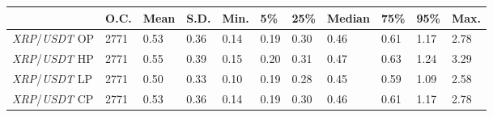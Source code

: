 \begin{tabular}{lllllllllll}
\toprule
 & \textbf{O.C.} & \textbf{Mean} & \textbf{S.D.} & \textbf{Min.} & \textbf{5\%} & \textbf{25\%} & \textbf{Median} & \textbf{75\%} & \textbf{95\%} & \textbf{Max.} \\
\midrule
\emph{XRP}/\emph{USDT} OP & 2771 & 0.53 & 0.36 & 0.14 & 0.19 & 0.30 & 0.46 & 0.61 & 1.17 & 2.78 \\
\emph{XRP}/\emph{USDT} HP & 2771 & 0.55 & 0.39 & 0.15 & 0.20 & 0.31 & 0.47 & 0.63 & 1.24 & 3.29 \\
\emph{XRP}/\emph{USDT} LP & 2771 & 0.50 & 0.33 & 0.10 & 0.19 & 0.28 & 0.45 & 0.59 & 1.09 & 2.58 \\
\emph{XRP}/\emph{USDT} CP & 2771 & 0.53 & 0.36 & 0.14 & 0.19 & 0.30 & 0.46 & 0.61 & 1.17 & 2.78 \\
\bottomrule
\end{tabular}
